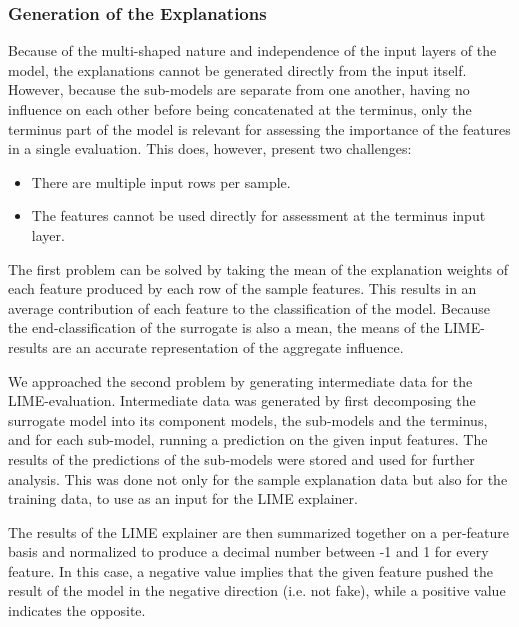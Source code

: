 \documentclass{article}
\begin{document}
			\subsubsection{Generation of the Explanations}
			Because of the multi-shaped nature and independence of the input layers of the model,
			the explanations cannot be generated directly from the input itself. However, because
			the sub-models are separate from one another, having no influence on each other before
			being concatenated at the terminus, only the terminus part of the model is relevant
			for assessing the importance of the features in a single evaluation. This does,
			however, present two challenges:
			\begin{itemize}
				\item There are multiple input rows per sample.
				\item The features cannot be used directly for assessment at the terminus input
					layer.
			\end{itemize}
			The first problem can be solved by taking the mean of the explanation weights of each
			feature produced by each row of the sample features. This results in an average
			contribution of each feature to the classification of the model. Because the
			end-classification of the surrogate is also a mean, the means of the LIME-results are
			an accurate representation of the aggregate influence.
			\par
			We approached the second problem by generating intermediate data for the
			LIME-evaluation. Intermediate data was generated by first decomposing the surrogate
			model into its component models, the sub-models and the terminus, and for each
			sub-model, running a prediction on the given input features. The results of the
			predictions of the sub-models were stored and used for further analysis. This was done
			not only for the sample explanation data but also for the training data, to use as an
			input for the LIME explainer.
			\par
			The results of the LIME explainer are then summarized together on a per-feature basis
			and normalized to produce a decimal number between -1 and 1 for every feature. In this
			case, a negative value implies that the given feature pushed the result of the model
			in the negative direction (i.e. not fake), while a positive value indicates the
			opposite.
\end{document}
